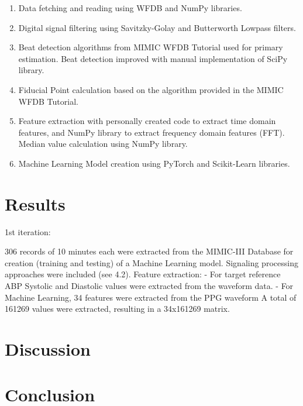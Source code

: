 \documentclass[12pt, bibliography=totoc]{scrartcl}
\begin{document}
\begin{enumerate}

\item Data fetching and reading using WFDB and NumPy libraries.

\item Digital signal filtering using Savitzky-Golay and Butterworth Lowpass filters.

\item Beat detection algorithms from MIMIC WFDB Tutorial used for primary estimation.
Beat detection improved with manual implementation of SciPy library.

\item Fiducial Point calculation based on the algorithm provided in the MIMIC WFDB Tutorial.

\item Feature extraction with personally created code to extract time domain features, and NumPy library to extract frequency domain features (FFT). Median value calculation using NumPy library.

\item Machine Learning Model creation using PyTorch and Scikit-Learn libraries.

\end{enumerate}

\section{Results}
\label{results}

1st iteration:

306 records of 10 minutes each were extracted from the MIMIC-III Database for creation (training and testing) of a Machine Learning model.
Signaling processing approaches were included (see 4.2).
Feature extraction:
- For target reference ABP Systolic and Diastolic values were extracted from the waveform data.
- For Machine Learning, 34 features were extracted from the PPG waveform
A total of 161269 values were extracted, resulting in a 34x161269 matrix.


\section{Discussion}
\label{discussion}

\section{Conclusion}
\label{conclusion}



\end{document}
